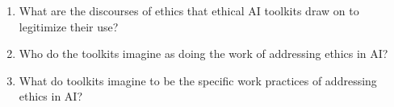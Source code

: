 \documentclass[acmsmall]{acmart}
\begin{document}

\begin{enumerate}[label=(RQ\arabic*)]
    \item What are the discourses of ethics that ethical AI toolkits draw on to legitimize their use? %
    \item Who do the toolkits imagine as doing the work of addressing ethics in AI? %
    \item What do toolkits imagine to be the specific work practices of addressing ethics in AI?
\end{enumerate}
\end{document}
